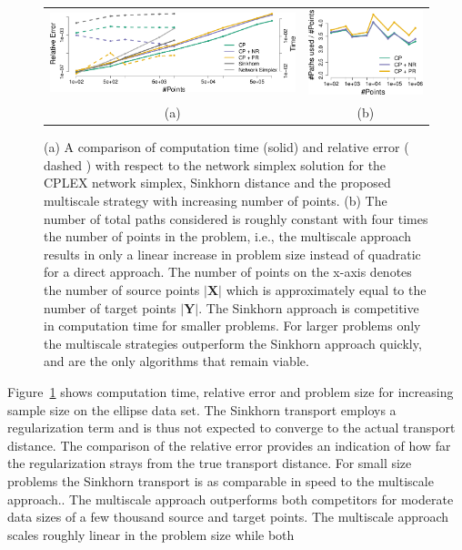 \documentclass[twoside,11pt]{article}
\newcommand{\Xsp}{{\mathbf{X}}}
\newcommand{\Ysp}{{\mathbf{Y}}}
\begin{document}
\begin{figure}[htb]
\centering
\begin{tabular}{cc}
  \includegraphics[width=0.65\linewidth]{ellipses-performance-npoints} &
\includegraphics[width=0.28\linewidth]{ellipses-performance-npoints-used} \\
(a) & (b)
\end{tabular}
\caption{
\label{fig:npoints}
(a) A comparison of computation time (solid) and relative error ( dashed ) with
respect to the network simplex solution for the CPLEX network simplex, Sinkhorn
distance and the proposed multiscale strategy with increasing number of points.
(b) The number of total paths considered is roughly constant with four times
the number of points in the problem, i.e., the multiscale approach results in
only a linear increase in problem size instead of quadratic for a direct
approach.  The number of points on the x-axis denotes the number of source
points $|\Xsp|$ which is approximately equal to the number of target points
$|\Ysp|$.  The Sinkhorn approach is competitive in computation time for smaller
problems.  For larger problems only the multiscale strategies outperform the
Sinkhorn approach quickly, and are the only algorithms that remain viable.
} 
\end{figure}
Figure~\ref{fig:npoints} shows computation time, relative error and problem
size for increasing sample size on the ellipse data set. The Sinkhorn transport
employs a regularization term and is thus not expected to converge to the
actual transport distance. The comparison of the relative error provides an
indication of how far the regularization strays from the true transport
distance. For small size problems the Sinkhorn transport is as comparable in
speed to the multiscale approach.. The multiscale approach outperforms both
competitors for moderate data sizes of a few thousand source and target points.
The multiscale approach scales roughly linear in the problem size while both
\end{document}
